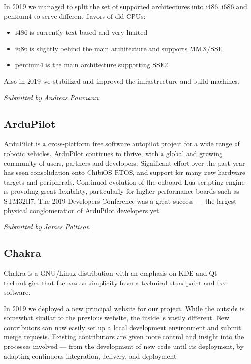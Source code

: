 \documentclass[a4paper]{report}
\begin{document}
In 2019 we managed to split the set of supported architectures into
i486, i686 and pentium4 to serve different flavors of old CPUs:

\begin{itemize}

\item i486 is currently text-based and very limited
\item i686 is slightly behind the main architecture and supports MMX/SSE
\item pentium4 is the main architecture supporting SSE2

\end{itemize}

Also in 2019 we stabilized and improved the infrastructure and build
machines.

{\em Submitted by Andreas Baumann}

\subsection{ArduPilot}

ArduPilot is a cross-platform free software autopilot project for a wide
range of robotic vehicles. ArduPilot continues to thrive, with a global
and growing community of users, partners and developers. Significant
effort over the past year has seen consolidation onto ChibiOS RTOS, and
support for many new hardware targets and peripherals.  Continued
evolution of the onboard Lua scripting engine is providing great
flexibility, particularly for higher performance boards such as STM32H7.
The 2019 Developers Conference was a great success --- the largest
physical conglomeration of ArduPilot developers yet.

{\em Submitted by James Pattison}

\subsection{Chakra}

Chakra is a GNU/Linux distribution with an emphasis on KDE and Qt
technologies that focuses on simplicity from a technical standpoint and
free software.

In 2019 we deployed a new principal website for our project. While the
outside is somewhat similar to the previous website, the inside is
vastly different. New contributors can now easily set up a local
development environment and submit merge requests.  Existing
contributors are given more control and insight into the processes
involved --- from the development of new code until its deployment, by
adapting continuous integration, delivery, and deployment.
\end{document}
